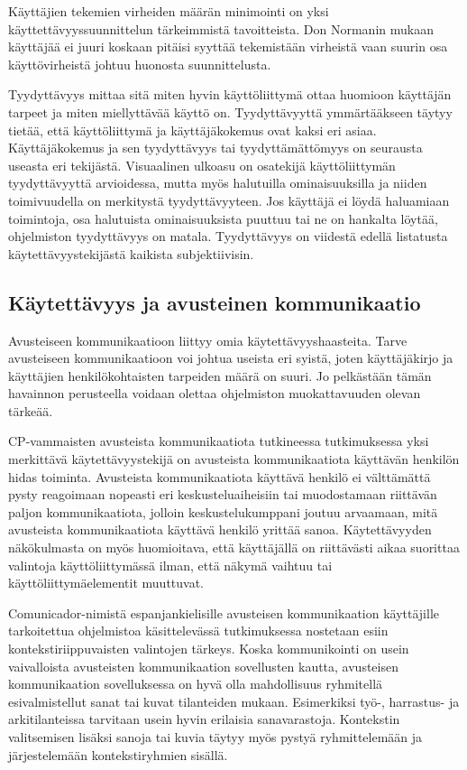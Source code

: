 \documentclass[utf8]{gradu3}
\begin{document}
Käyttäjien tekemien virheiden määrän minimointi on yksi käyttettävyyssuunnittelun tärkeimmistä tavoitteista. Don Normanin \parencite[]{norman-doet} mukaan  käyttäjää ei juuri koskaan pitäisi syyttää tekemistään virheistä vaan suurin osa käyttövirheistä johtuu huonosta suunnittelusta.

Tyydyttävyys mittaa sitä miten hyvin käyttöliittymä ottaa huomioon käyttäjän tarpeet ja miten miellyttävää käyttö on. Tyydyttävyyttä ymmärtääkseen täytyy tietää, että käyttöliittymä ja käyttäjäkokemus ovat kaksi eri asiaa. Käyttäjäkokemus ja sen tyydyttävyys tai tyydyttämättömyys on seurausta useasta eri tekijästä. Visuaalinen ulkoasu on osatekijä käyttöliittymän tyydyttävyyttä arvioidessa, mutta myös halutuilla ominaisuuksilla ja niiden toimivuudella on merkitystä tyydyttävyyteen. Jos käyttäjä ei löydä haluamiaan toimintoja, osa halutuista ominaisuuksista puuttuu tai ne on hankalta löytää, ohjelmiston tyydyttävyys on matala. Tyydyttävyys on viidestä edellä listatusta käytettävyystekijästä kaikista subjektiivisin.

\subsection{Käytettävyys ja avusteinen kommunikaatio}

Avusteiseen kommunikaatioon liittyy omia käytettävyyshaasteita. Tarve avusteiseen kommunikaatioon voi johtua useista eri syistä, joten käyttäjäkirjo ja käyttäjien henkilökohtaisten tarpeiden määrä on suuri. Jo pelkästään tämän havainnon perusteella voidaan olettaa ohjelmiston muokattavuuden olevan tärkeää.

CP-vammaisten avusteista kommunikaatiota tutkineessa tutkimuksessa \parencite[]{classmate-aac-study} yksi merkittävä käytettävyystekijä on avusteista kommunikaatiota käyttävän henkilön hidas toiminta. Avusteista kommunikaatiota käyttävä henkilö ei välttämättä pysty reagoimaan nopeasti eri keskusteluaiheisiin tai muodostamaan riittävän paljon kommunikaatiota, jolloin keskustelukumppani joutuu arvaamaan, mitä avusteista kommunikaatiota käyttävä henkilö yrittää sanoa. Käytettävyyden näkökulmasta on myös huomioitava, että käyttäjällä on riittävästi aikaa suorittaa valintoja käyttöliittymässä ilman, että näkymä vaihtuu tai käyttöliittymäelementit muuttuvat.

\label{AAC-context-settings}
Comunicador-nimistä espanjankielisille avusteisen kommunikaation käyttäjille tarkoitettua ohjelmistoa käsittelevässä tutkimuksessa \parencite[]{graphic-communicator} nostetaan esiin kontekstiriippuvaisten valintojen tärkeys. Koska kommunikointi on usein vaivalloista avusteisten kommunikaation sovellusten kautta, avusteisen kommunikaation sovelluksessa on hyvä olla mahdollisuus ryhmitellä esivalmistellut sanat tai kuvat tilanteiden mukaan. Esimerkiksi työ-, harrastus- ja arkitilanteissa tarvitaan usein hyvin erilaisia sanavarastoja. Kontekstin valitsemisen lisäksi sanoja tai kuvia täytyy myös pystyä ryhmittelemään ja järjestelemään kontekstiryhmien sisällä.
\end{document}
